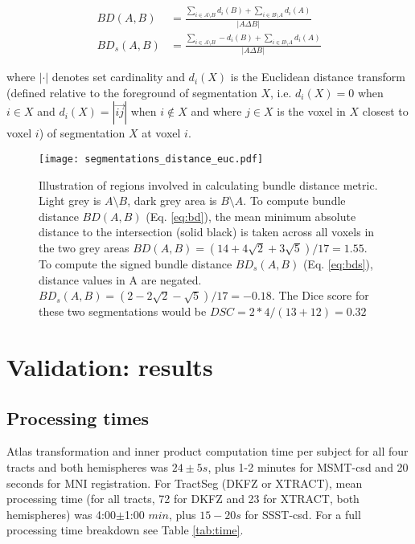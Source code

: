 \begin{align}
  BD(A,B) &= \frac{\sum_{i \in A\setminus B} d_i(B) + \sum_{i \in B\setminus A} d_i(A)}{|A\Delta B|} \label{eq:bd} \\
  BD_s(A,B) &= \frac{\sum_{i \in A\setminus B} - d_i(B) + \sum_{i \in B\setminus A} d_i(A)}{|A\Delta B|} \label{eq:bds}
\end{align}

where $| \cdot |$ denotes set cardinality and $d_i(X)$ is the Euclidean distance transform (defined relative to the foreground of segmentation $X$, i.e. $d_i(X) = 0$ when $i \in X $ and $d_i(X) = |\overrightarrow{ij}|$ when $i \not\in X$ and where $j \in X$ is the voxel in $X$ closest to voxel $i$)  of segmentation $X$ at voxel $i$.

\begin{SCfigure}[50][htbp!]
  \centering
  \texttt{[image: segmentations\_distance\_euc.pdf]}
  \caption{Illustration of regions involved in calculating bundle distance metric. Light grey is $A\setminus B$, dark grey area is $B\setminus A$. To compute bundle distance $BD(A,B)$ (Eq. \ref{eq:bd}), the mean minimum absolute distance to the intersection (solid black) is taken across all voxels in the two grey areas $BD(A,B) = (14+4\sqrt{2}+3\sqrt{5})/17 = 1.55$. To compute the signed bundle distance $BD_s(A,B)$ (Eq. \ref{eq:bds}), distance values in A are negated. $BD_s(A,B) = (2-2\sqrt{2}-\sqrt{5})/17 = -0.18$. The Dice score for these two segmentations would be $DSC = 2*4/(13+12) = 0.32$}
  \label{fig:BD}
\end{SCfigure}

\section{Validation: results}
\label{sec:validation}

\subsection{Processing times}

Atlas transformation and inner product computation time per subject for all four tracts and both hemispheres was $24\pm5 s$, plus 1-2 minutes for MSMT-\gls{csd} and 20 seconds for MNI registration.
For TractSeg (DKFZ or XTRACT), mean processing time (for all tracts, 72 for DKFZ and 23 for XTRACT, both hemispheres) was 4:00$\pm$1:00 $min$, plus $15-20 s$ for SSST-\gls{csd}.
For a full processing time breakdown see Table \ref{tab:time}.

